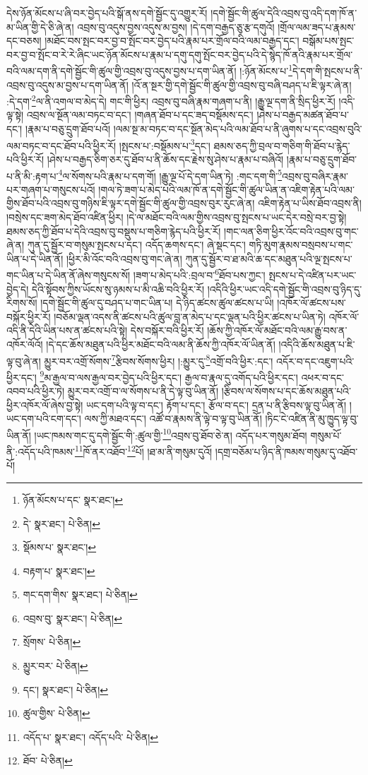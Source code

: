 དེས་ཉོན་མོངས་པ་ཞི་བར་བྱེད་པའི་སྒོ་ནས་དགེ་སྦྱོང་དུ་འགྱུར་རོ། །དགེ་སྦྱོང་གི་ཚུལ་དེའི་འབྲས་བུ་འདི་དག་ཁོ་ན་མ་ཡིན་གྱི་དེ་ཅི་ཞེ་ན། འབྲས་བུ་འདུས་བྱས་འདུས་མ་བྱས། །དེ་དག་བརྒྱད་ཅུ་རྩ་དགུའོ། །གྲོལ་ལམ་ཟད་པ་རྣམས་དང་བཅས། །མཐོང་བས་སྤང་བར་བྱ་བ་སྤོང་བར་བྱེད་པའི་རྣམ་པར་གྲོལ་བའི་ལམ་བརྒྱད་དང་། བསྒོམ་པས་སྤང་བར་བྱ་བ་སྤོང་བ་རེ་རེ་ཞིང་ཡང་ཉོན་མོངས་པ་རྣམ་པ་དགུ་དགུ་སྤོང་བར་བྱེད་པའི་དེ་སྙེད་ཁོ་ནའི་རྣམ་པར་གྲོལ་བའི་ལམ་དག་ནི་དགེ་སྦྱོང་གི་ཚུལ་གྱི་འབྲས་བུ་འདུས་བྱས་པ་དག་ཡིན་ནོ། །:ཉོན་མོངས་པ་\footnote{ཉོན་མོངས་པ་དང་  སྣར་ཐང་། }དེ་དག་གི་སྤངས་པ་ནི་འབྲས་བུ་འདུས་མ་བྱས་པ་དག་ཡིན་ནོ། །འོ་ན་སྔར་གྱི་དགེ་སྦྱོང་གི་ཚུལ་གྱི་འབྲས་བུ་བཞི་བཤད་པ་ཇི་ལྟར་ཞེ་ན། :དེ་དག་\footnote{དེ་  སྣར་ཐང་།  པེ་ཅིན། }ལ་ནི་འགལ་བ་མེད་དེ། གང་གི་ཕྱིར། འབྲས་བུ་བཞི་རྣམ་གཞག་པ་ནི། །རྒྱུ་ལྔ་དག་ནི་སྲིད་ཕྱིར་རོ། །འདི་ལྟ་སྟེ། འབྲས་ལ་སྔོན་ལམ་བཏང་བ་དང་། །གཞན་ཐོབ་པ་དང་ཟད་བསྡོམས་དང་། །ཤེས་པ་བརྒྱད་མཚན་ཐོབ་པ་དང་། །རྣམ་པ་བཅུ་དྲུག་ཐོབ་པའོ། །ལམ་སྔ་མ་བཏང་བ་དང་སྔོན་མེད་པའི་ལམ་ཐོབ་པ་ནི་ཞུགས་པ་དང་འབྲས་བུའི་ལམ་བཏང་བ་དང་ཐོབ་པའི་ཕྱིར་རོ། །སྤངས་པ་:བསྡོམས་པ་\footnote{སྡོམས་པ་  སྣར་ཐང་། }དང་། ཐམས་ཅད་ཀྱི་བྲལ་བ་གཅིག་གི་ཐོབ་པ་རྙེད་པའི་ཕྱིར་རོ། །ཤེས་པ་བརྒྱད་ཅིག་ཅར་དུ་ཐོབ་པ་ནི་ཆོས་དང་རྗེས་སུ་ཤེས་པ་རྣམ་པ་བཞིའོ། །རྣམ་པ་བཅུ་དྲུག་ཐོབ་པ་ནི་མི་:རྟག་པ་\footnote{བརྟག་པ་  སྣར་ཐང་། }ལ་སོགས་པའི་རྣམ་པ་དག་གོ། །རྒྱུ་ལྔ་པོ་དེ་དག་ཡིན་ཏེ། :གང་དག་གི་\footnote{གང་དག་གིས་  སྣར་ཐང་།  པེ་ཅིན། }འབྲས་བུ་བཞིར་རྣམ་པར་གཞག་པ་གསུངས་པའོ། །གལ་ཏེ་ཟག་པ་མེད་པའི་ལམ་ཁོ་ན་དགེ་སྦྱོང་གི་ཚུལ་ཡིན་ན་འཇིག་རྟེན་པའི་ལམ་གྱིས་ཐོབ་པའི་འབྲས་བུ་གཉིས་ཇི་ལྟར་དགེ་སྦྱོང་གི་ཚུལ་གྱི་འབྲས་བུར་རུང་ཞེ་ན། འཇིག་རྟེན་པ་ཡིས་ཐོབ་འབྲས་ནི། །བསྲེས་དང་ཟག་མེད་ཐོབ་འཛིན་ཕྱིར། །དེ་ལ་མཐོང་བའི་ལམ་གྱིས་འབྲས་བུ་སྤངས་པ་ཡང་དེར་བསྲེ་བར་བྱ་སྟེ། ཐམས་ཅད་ཀྱི་ཐོབ་པ་དེའི་འབྲས་བུ་བསྡུས་པ་གཅིག་རྙེད་པའི་ཕྱིར་རོ། །གང་ལན་ཅིག་ཕྱིར་འོང་བའི་འབྲས་བུ་གང་ཞེ་ན། ཀུན་དུ་སྦྱོར་བ་གསུམ་སྤངས་པ་དང་། འདོད་ཆགས་དང་། ཞེ་སྡང་དང་། གཏི་མུག་རྣམས་བསྲབས་པ་གང་ཡིན་པ་དེ་ཡིན་ནོ། །ཕྱིར་མི་འོང་བའི་འབྲས་བུ་གང་ཞེ་ན། ཀུན་དུ་སྦྱོར་བ་ཐ་མའི་ཆ་དང་མཐུན་པའི་ལྔ་སྤངས་པ་གང་ཡིན་པ་དེ་ཡིན་ནོ་ཞེས་གསུངས་སོ། །ཟག་པ་མེད་པའི་:བྲལ་བ་\footnote{འབྲས་བུ་  སྣར་ཐང་།  པེ་ཅིན། }ཐོབ་པས་ཀྱང་། སྤངས་པ་དེ་འཛིན་པར་ཡང་བྱེད་དེ། དེའི་སྟོབས་ཀྱིས་ཡོངས་སུ་ཉམས་པ་མི་འཆི་བའི་ཕྱིར་རོ། །འདིའི་ཕྱིར་ཡང་འདི་དགེ་སྦྱོང་གི་འབྲས་བུ་ཉིད་དུ་རིགས་སོ། །དགེ་སྦྱོང་གི་ཚུལ་དུ་བཤད་པ་གང་ཡིན་པ། དེ་ཉིད་ཚངས་ཚུལ་ཚངས་པ་ཡི། །འཁོར་ལོ་ཚངས་པས་བསྐོར་ཕྱིར་རོ། །བཅོམ་ལྡན་འདས་ནི་ཚངས་པའི་ཚུལ་བླ་ན་མེད་པ་དང་ལྡན་པའི་ཕྱིར་ཚངས་པ་ཡིན་ཏེ། འཁོར་ལོ་འདི་ནི་དེའི་ཡིན་པས་ན་ཚངས་པའི་སྟེ། དེས་བསྐོར་བའི་ཕྱིར་རོ། །ཆོས་ཀྱི་འཁོར་ལོ་མཐོང་བའི་ལམ་རྒྱུ་བས་ན་འཁོར་ལོའོ། །དེ་དང་ཆོས་མཐུན་པའི་ཕྱིར་མཐོང་བའི་ལམ་ནི་ཆོས་ཀྱི་འཁོར་ལོ་ཡིན་ནོ། །འདིའི་ཆོས་མཐུན་པ་ཇི་ལྟ་བུ་ཞེ་ན། མྱུར་བར་འགྲོ་སོགས་\footnote{སྲོགས་  པེ་ཅིན། }རྩིབས་སོགས་ཕྱིར། །:མྱུར་དུ་\footnote{མྱུར་བར་  པེ་ཅིན། }འགྲོ་བའི་ཕྱིར་:དང་། འདོར་བ་དང་འཇུག་པའི་ཕྱིར་དང་། \footnote{དང་།    སྣར་ཐང་།  པེ་ཅིན། }མ་རྒྱལ་བ་ལས་རྒྱལ་བར་བྱེད་པའི་ཕྱིར་དང་། རྒྱལ་བ་རྣལ་དུ་འགོད་པའི་ཕྱིར་དང་། འཕར་བ་དང་འབབ་པའི་ཕྱིར་ཏེ། མྱུར་བར་འགྲོ་བ་ལ་སོགས་པ་ནི་དེ་ལྟ་བུ་ཡིན་ནོ། །རྩིབས་ལ་སོགས་པ་དང་ཆོས་མཐུན་པའི་ཕྱིར་འཁོར་ལོ་ཞེས་བྱ་སྟེ། ཡང་དག་པའི་ལྟ་བ་དང་། རྟོག་པ་དང་། རྩོལ་བ་དང་། དྲན་པ་ནི་རྩིབས་ལྟ་བུ་ཡིན་ནོ། །ཡང་དག་པའི་ངག་དང་། ལས་ཀྱི་མཐའ་དང་། འཚོ་བ་རྣམས་ནི་ལྟེ་བ་ལྟ་བུ་ཡིན་ནོ། །ཏིང་ངེ་འཛིན་ནི་མུ་ཁྱུད་ལྟ་བུ་ཡིན་ནོ། །ཡང་ཁམས་གང་དུ་དགེ་སྦྱོང་གི་:ཚུལ་གྱི་\footnote{ཚུལ་གྱིས་  པེ་ཅིན། }འབྲས་བུ་ཐོབ་ཅེ་ན། འདོད་པར་གསུམ་ཐོབ། གསུམ་པོ་ནི་:འདོད་པའི་ཁམས་\footnote{འདོད་པ་  སྣར་ཐང་། འདོད་པའི་  པེ་ཅིན། }ཁོ་ནར་འཐོབ་\footnote{ཐོབ་  པེ་ཅིན། }པོ། །ཐ་མ་ནི་གསུམ་དུའོ། །དགྲ་བཅོམ་པ་ཉིད་ནི་ཁམས་གསུམ་དུ་འཐོབ་པོ། 